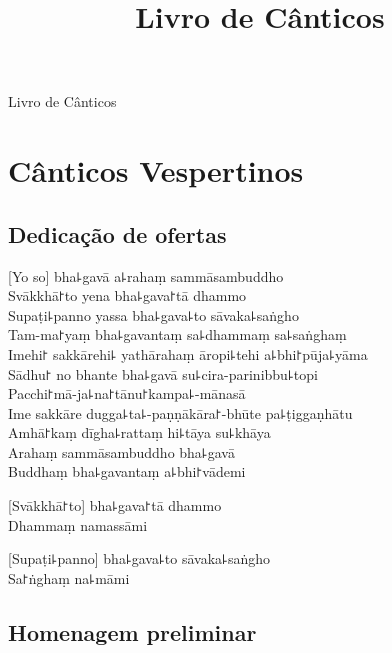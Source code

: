 \documentclass[
  babelLanguage=portuguese,
  final,
  showtrims,
]{chantingbook}
\title{Livro de Cânticos}
\subtitle{}
\begin{document}
\frontmatter

\thispagestyle{empty}

{\centering
\mbox{}
\vfill

\parttitlefont\color{chaptertitle}

Livro de Cânticos

\vspace*{4\baselineskip}

\vfill

\mbox{}
}

\mainmatter

\part{Cânticos Vespertinos}

\usePsMarksPartOnly

\artopttrue

\cleartorecto
\chapter{Dedicação de ofertas}
\setcounter{page}{1}

[Yo so] bha꜕gavā a꜕rahaṃ sammāsambuddho\\
Svākkhā꜓to yena bha꜕gava꜓tā dhammo\\
Supaṭi꜕panno yassa bha꜕gava꜕to sāvaka꜕saṅgho\\
Tam-ma꜓yaṃ bha꜕gavantaṃ sa꜕dhammaṃ sa꜕saṅghaṃ\\
Imehi꜓ sakkārehi꜕ yathārahaṃ āropi꜕tehi a꜕bhi꜓pūja꜕yāma\\
Sādhu꜓ no bhante bha꜕gavā su꜕cira-parinibbu꜕topi\\
Pacchi꜓mā-ja꜕na꜓tānu꜓kampa꜕-mānasā\\
Ime sakkāre dugga꜕ta꜕-paṇṇākāra꜓-bhūte pa꜕ṭiggaṇhātu\\
Amhā꜓kaṃ dīgha꜕rattaṃ hi꜕tāya su꜕khāya\\
Arahaṃ sammāsambuddho bha꜕gavā\\
Buddhaṃ bha꜕gavantaṃ a꜕bhi꜓vādemi

[Svākkhā꜓to] bha꜕gava꜓tā dhammo\\
Dhammaṃ namassāmi

[Supaṭi꜕panno] bha꜕gava꜕to sāvaka꜕saṅgho\\
Sa꜓ṅghaṃ na꜕māmi

\chapter{Homenagem preliminar}
\end{document}
